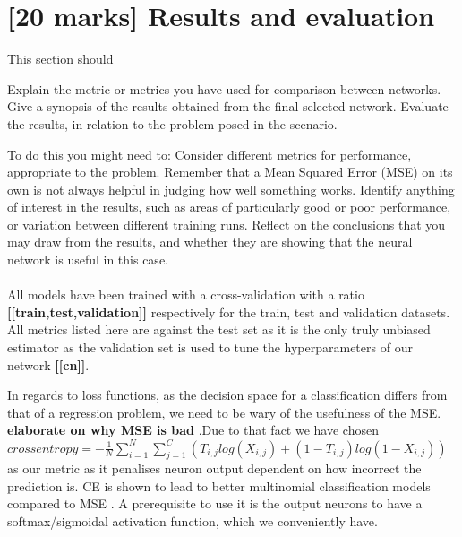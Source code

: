 \documentclass[11pt,a4paper]{article}
\begin{document}
\section{[20 marks] Results and evaluation}
\label{sec:results}
This section should
\begin{outline}
  \1 Explain the metric or metrics you have used for comparison between networks.
  \1 Give a synopsis of the results obtained from the final selected network.
  \1 Evaluate the results, in relation to the problem posed in the scenario. 
\end{outline}
\begin{outline}
To do this you might need to:
  \1 Consider different metrics for performance, appropriate to the problem. Remember that a Mean Squared Error (MSE) on its own is not always helpful in judging how well something works.
  \1 Identify anything of interest in the results, such as areas of particularly good or poor performance, or variation between different training runs.
  \1 Reflect on the conclusions that you may draw from the results, and whether they are showing that the neural network is useful in this case.
\end{outline}

\paragraph{}
All models have been trained with a cross-validation with a ratio \textbf{[[train,test,validation]]} respectively for the train, test and validation datasets. All metrics listed here are against the test set as it is the only truly unbiased estimator as the validation set is used to tune the hyperparameters of our network \textbf{[[cn]]}.

In regards to loss functions, as the decision space for a classification differs from that of a regression problem, we need to be wary of the usefulness of the MSE. \textbf{elaborate on why MSE is bad} .Due to that fact we have chosen \(crossentropy = -\frac{1}{N}\sum_{i=1}^N\sum_{j=1}^C(T_{i,j}log(X_{i,j})+(1 - T_{i,j})log(1-X_{i,j}))\) as our metric as it penalises neuron output dependent on how incorrect the prediction is. CE is shown to lead to better multinomial classification models compared to MSE \autocite{Golik2013CrossentropyVS}. A prerequisite to use it is the output neurons to have a softmax/sigmoidal activation function, which we conveniently have.
\end{document}
